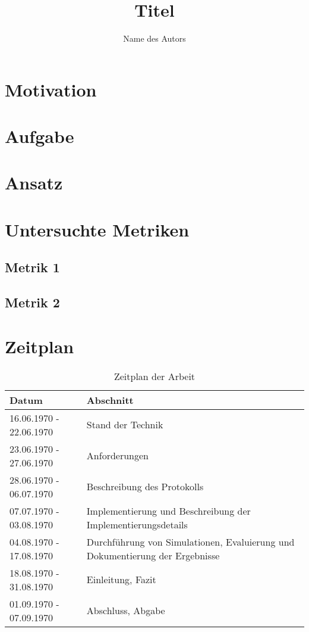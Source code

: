 \documentclass[fontsize=11pt,%
               paper=a4,%
               DIV=17]{scrartcl}
\title{Titel}
\author{Name des Autors}
\begin{document}
\maketitle

\section*{Motivation}
\blindtext

\section*{Aufgabe}
\blindtext

\section*{Ansatz}
\blindtext

\section*{Untersuchte Metriken}
\blindtext

\subsection*{Metrik 1}
\blindtext

\subsection*{Metrik 2}
\blindtext

\section*{Zeitplan}
\blindtext

\begin{table}[!ht]
\caption{Zeitplan der Arbeit}
\begin{tabular}{p{}p{}}
\toprule
\textbf{Datum} & \textbf{Abschnitt} \\
\midrule
16.06.1970 - 22.06.1970 &  Stand der Technik\\
23.06.1970 - 27.06.1970	&  Anforderungen\\
28.06.1970 - 06.07.1970 &  Beschreibung des Protokolls\\
07.07.1970 - 03.08.1970 &  Implementierung und Beschreibung der Implementierungsdetails\\
04.08.1970 - 17.08.1970 &  Durchführung von Simulationen, Evaluierung und Dokumentierung der Ergebnisse\\
18.08.1970 - 31.08.1970 &  Einleitung, Fazit\\
01.09.1970 - 07.09.1970 &  Abschluss, Abgabe\\
\bottomrule
\end{tabular}
\end{table}
\end{document}
